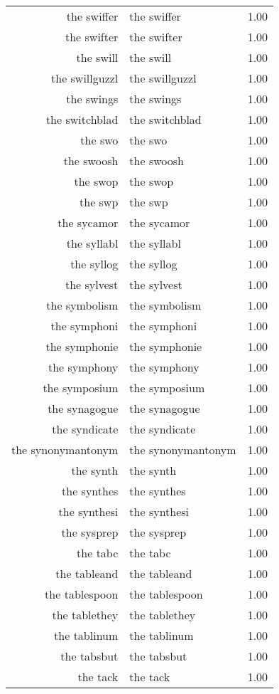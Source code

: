 \begin{table}[ht]
\begin{tabular}{rlr}
  the swiffer & the swiffer & 1.00 \\ 
  the swifter & the swifter & 1.00 \\ 
  the swill & the swill & 1.00 \\ 
  the swillguzzl & the swillguzzl & 1.00 \\ 
  the swings & the swings & 1.00 \\ 
  the switchblad & the switchblad & 1.00 \\ 
  the swo & the swo & 1.00 \\ 
  the swoosh & the swoosh & 1.00 \\ 
  the swop & the swop & 1.00 \\ 
  the swp & the swp & 1.00 \\ 
  the sycamor & the sycamor & 1.00 \\ 
  the syllabl & the syllabl & 1.00 \\ 
  the syllog & the syllog & 1.00 \\ 
  the sylvest & the sylvest & 1.00 \\ 
  the symbolism & the symbolism & 1.00 \\ 
  the symphoni & the symphoni & 1.00 \\ 
  the symphonie & the symphonie & 1.00 \\ 
  the symphony & the symphony & 1.00 \\ 
  the symposium & the symposium & 1.00 \\ 
  the synagogue & the synagogue & 1.00 \\ 
  the syndicate & the syndicate & 1.00 \\ 
  the synonymantonym & the synonymantonym & 1.00 \\ 
  the synth & the synth & 1.00 \\ 
  the synthes & the synthes & 1.00 \\ 
  the synthesi & the synthesi & 1.00 \\ 
  the sysprep & the sysprep & 1.00 \\ 
  the tabc & the tabc & 1.00 \\ 
  the tableand & the tableand & 1.00 \\ 
  the tablespoon & the tablespoon & 1.00 \\ 
  the tablethey & the tablethey & 1.00 \\ 
  the tablinum & the tablinum & 1.00 \\ 
  the tabsbut & the tabsbut & 1.00 \\ 
  the tack & the tack & 1.00 \\ 

\end{tabular}
\end{table}
